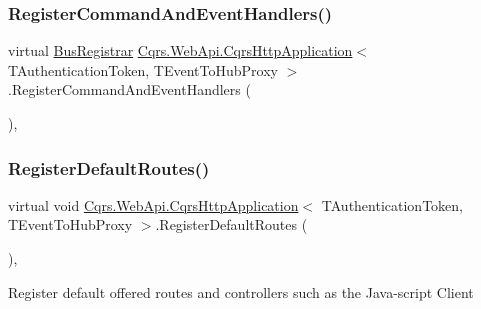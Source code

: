 \subsubsection{\texorpdfstring{Register\+Command\+And\+Event\+Handlers()}{RegisterCommandAndEventHandlers()}}
{\footnotesize\ttfamily virtual \hyperlink{classCqrs_1_1Configuration_1_1BusRegistrar}{Bus\+Registrar} \hyperlink{classCqrs_1_1WebApi_1_1CqrsHttpApplication}{Cqrs.\+Web\+Api.\+Cqrs\+Http\+Application}$<$ T\+Authentication\+Token, T\+Event\+To\+Hub\+Proxy $>$.Register\+Command\+And\+Event\+Handlers (\begin{DoxyParamCaption}{ }\end{DoxyParamCaption})\hspace{0.3cm}{\ttfamily [protected]}, {\ttfamily [virtual]}}

\mbox{\label{classCqrs_1_1WebApi_1_1CqrsHttpApplication_afaeb2e7a6c5e3e65ef1ff23ae6224070_afaeb2e7a6c5e3e65ef1ff23ae6224070}} 
\subsubsection{\texorpdfstring{Register\+Default\+Routes()}{RegisterDefaultRoutes()}}
{\footnotesize\ttfamily virtual void \hyperlink{classCqrs_1_1WebApi_1_1CqrsHttpApplication}{Cqrs.\+Web\+Api.\+Cqrs\+Http\+Application}$<$ T\+Authentication\+Token, T\+Event\+To\+Hub\+Proxy $>$.Register\+Default\+Routes (\begin{DoxyParamCaption}{ }\end{DoxyParamCaption})\hspace{0.3cm}{\ttfamily [protected]}, {\ttfamily [virtual]}}



Register default offered routes and controllers such as the Java-\/script Client 

\mbox{\label{classCqrs_1_1WebApi_1_1CqrsHttpApplication_ad47fbc81b57345f9998345a2e270da5c_ad47fbc81b57345f9998345a2e270da5c}} 
